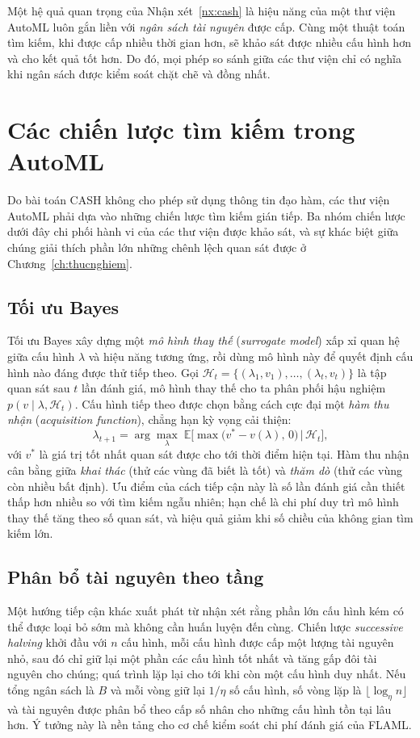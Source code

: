 Một hệ quả quan trọng của Nhận xét~\ref{nx:cash} là hiệu năng của một thư viện
AutoML luôn gắn liền với \emph{ngân sách tài nguyên} được cấp. Cùng một thuật
toán tìm kiếm, khi được cấp nhiều thời gian hơn, sẽ khảo sát được nhiều cấu hình
hơn và cho kết quả tốt hơn. Do đó, mọi phép so sánh giữa các thư viện chỉ có
nghĩa khi ngân sách được kiểm soát chặt chẽ và đồng nhất.

\section{Các chiến lược tìm kiếm trong AutoML}
\label{sec:chienluoc}
Do bài toán CASH không cho phép sử dụng thông tin đạo hàm, các thư viện AutoML
phải dựa vào những chiến lược tìm kiếm gián tiếp. Ba nhóm chiến lược dưới đây chi
phối hành vi của các thư viện được khảo sát, và sự khác biệt giữa chúng giải thích
phần lớn những chênh lệch quan sát được ở Chương~\ref{ch:thucnghiem}.

\subsection{Tối ưu Bayes}
Tối ưu Bayes xây dựng một \emph{mô hình thay thế} (\textit{surrogate model}) xấp
xỉ quan hệ giữa cấu hình $\lambda$ và hiệu năng tương ứng, rồi dùng mô hình này để
quyết định cấu hình nào đáng được thử tiếp theo. Gọi $\mathcal{H}_t =
\{(\lambda_1, v_1), \dots, (\lambda_t, v_t)\}$ là tập quan sát sau $t$ lần đánh
giá, mô hình thay thế cho ta phân phối hậu nghiệm $p(v \mid \lambda, \mathcal{H}_t)$.
Cấu hình tiếp theo được chọn bằng cách cực đại một \emph{hàm thu nhận}
(\textit{acquisition function}), chẳng hạn kỳ vọng cải thiện:
\[
    \lambda_{t+1} = \arg\max_{\lambda}\;
    \mathbb{E}\Big[\max\big(v^{\ast} - v(\lambda),\, 0\big) \,\Big|\, \mathcal{H}_t\Big],
\]
với $v^{\ast}$ là giá trị tốt nhất quan sát được cho tới thời điểm hiện tại. Hàm
thu nhận cân bằng giữa \emph{khai thác} (thử các vùng đã biết là tốt) và
\emph{thăm dò} (thử các vùng còn nhiều bất định). Ưu điểm của cách tiếp cận này là
số lần đánh giá cần thiết thấp hơn nhiều so với tìm kiếm ngẫu nhiên; hạn chế là
chi phí duy trì mô hình thay thế tăng theo số quan sát, và hiệu quả giảm khi số
chiều của không gian tìm kiếm lớn.

\subsection{Phân bổ tài nguyên theo tầng}
Một hướng tiếp cận khác xuất phát từ nhận xét rằng phần lớn cấu hình kém có thể
được loại bỏ sớm mà không cần huấn luyện đến cùng. Chiến lược \textit{successive
halving} khởi đầu với $n$ cấu hình, mỗi cấu hình được cấp một lượng tài nguyên nhỏ,
sau đó chỉ giữ lại một phần các cấu hình tốt nhất và tăng gấp đôi tài nguyên cho
chúng; quá trình lặp lại cho tới khi còn một cấu hình duy nhất. Nếu tổng ngân sách
là $B$ và mỗi vòng giữ lại $1/\eta$ số cấu hình, số vòng lặp là
$\lfloor \log_{\eta} n \rfloor$ và tài nguyên được phân bổ theo cấp số nhân cho
những cấu hình tồn tại lâu hơn. Ý tưởng này là nền tảng cho cơ chế kiểm soát chi
phí đánh giá của FLAML.

